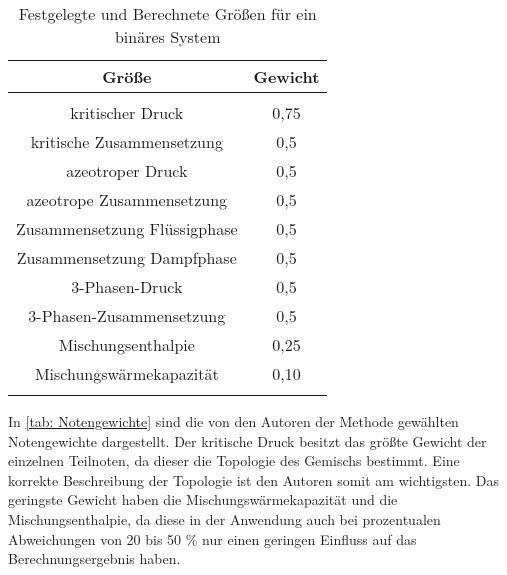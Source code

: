 \documentclass[../thesis.tex]{subfiles}
\begin{document}
\begin{table} [htb]
	\centering
	\caption{Festgelegte und Berechnete Größen für ein binäres System}
	\begin{tabular}{ cc }
		\hline 
		Größe & Gewicht \\
		\hline  \\ 
		[\dimexpr-\normalbaselineskip+2pt]
		kritischer Druck  & 0,75   \\
		kritische Zusammensetzung  & 0,5   \\
		azeotroper Druck  & 0,5  \\
		azeotrope Zusammensetzung  & 0,5  \\
		Zusammensetzung Flüssigphase & 0,5 \\
		Zusammensetzung Dampfphase & 0,5 \\
		3-Phasen-Druck & 0,5   \\
		3-Phasen-Zusammensetzung & 0,5  \\
		Mischungsenthalpie & 0,25 \\
		Mischungswärmekapazität & 0,10 \\
		[\dimexpr-\normalbaselineskip+18pt]
		\hline
		\label{tab: Notengewichte}
	\end{tabular}
\end{table}


In \autoref{tab: Notengewichte} sind die von den Autoren der Methode \cite{jaubert2020benchmark} gewählten Notengewichte dargestellt. Der kritische Druck besitzt das größte Gewicht der einzelnen Teilnoten, da dieser die Topologie des Gemischs bestimmt. Eine korrekte Beschreibung der Topologie ist den Autoren somit am wichtigsten. Das geringste Gewicht haben die Mischungswärmekapazität und die Mischungsenthalpie, da diese in der Anwendung auch bei prozentualen Abweichungen von 20 bis 50 \% nur einen geringen Einfluss auf das Berechnungsergebnis haben.
\end{document}
